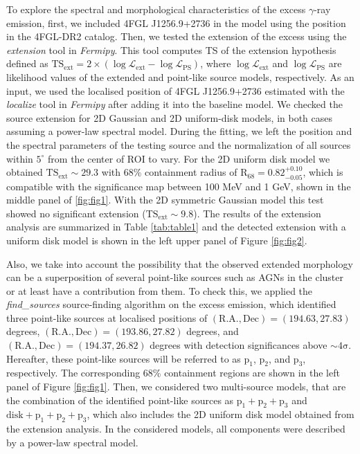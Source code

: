 \documentclass[fleqn,usenatbib]{mnras}
\begin{document}
To explore the spectral and morphological characteristics of the excess $\gamma$-ray emission, first, we included 4FGL J1256.9+2736 in the model using the position in the 4FGL-DR2 catalog. Then, we tested the extension of the excess using the \textit{extension} tool in \textit{Fermipy}. This tool computes TS of the extension hypothesis defined as $\mathrm{TS_{ext}} = 2\times(\log\mathcal{L}_\mathrm{ext} - \log\mathcal{L}_\mathrm{PS})$, where $\mathrm{\log\mathcal{L}_{ext}}$ and $\mathrm{\log\mathcal{L}_{PS}}$ are likelihood values of the extended and point-like source models, respectively. As an input, we used the localised position of 4FGL J1256.9+2736 estimated with the \textit{localize} tool in \textit{Fermipy} after adding it into the baseline model. We checked the source extension for 2D Gaussian and 2D uniform-disk models, in both cases assuming a power-law spectral model. During the fitting, we left the position and the spectral parameters of the testing source and the normalization of all sources within $\mathrm{5^\circ}$ from the center of ROI to vary. For the 2D uniform disk model we obtained $\mathrm{TS_{ext}\sim29.3}$ with 68\% containment radius of $\mathrm{R_{68}=0.82^{+0.10}_{-0.05}}$, which is compatible with the significance map between 100 MeV and 1 GeV, shown in the middle panel of \ref{fig:fig1}. With the 2D symmetric Gaussian model this test showed no significant extension ($\mathrm{TS_{ext}\sim9.8}$). The results of the extension analysis are summarized in Table \ref{tab:table1} and the detected extension with a uniform disk model is shown in the left upper panel of Figure \ref{fig:fig2}. 

Also, we take into account the possibility that the observed extended morphology can be a superposition of several point-like sources such as AGNs in the cluster or at least have a contribution from them. To check this, we applied the \textit{find{\_}sources} source-finding algorithm on the excess emission, which identified three point-like sources at localised positions of $\mathrm{(R.A., Dec) = (194.63, 27.83)}$ degrees, $\mathrm{(R.A., Dec) = (193.86, 27.82)}$ degrees, and $\mathrm{(R.A., Dec) = (194.37, 26.82)}$ degrees with detection significances above $\mathrm{\sim 4\sigma}$. Hereafter, these point-like sources will be referred to as $\mathrm{p_1}$, $\mathrm{p_2}$, and $\mathrm{p_3}$, respectively. The corresponding 68\% containment regions are shown in the left panel of Figure \ref{fig:fig1}. Then, we considered two multi-source models, that are the combination of the identified point-like sources as $\mathrm{p_1+p_2+p_3}$ and $\mathrm{disk+p_1+p_2+p_3}$, which also includes the 2D uniform disk model obtained from the extension analysis. In the considered models, all components were described by a power-law spectral model.
\end{document}
